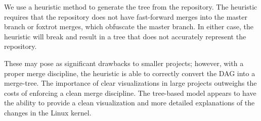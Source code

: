 \documentclass[conference, draftclsnofoot, draft]{IEEEtran}
\begin{document}
We use a heuristic method to generate the tree from the repository. The heuristic
requires that the repository does not have fast-forward merges into the master
branch or foxtrot merges, which obfuscate the master branch. In either case, the
heuristic will break and result in a tree that does not accurately represent the
repository.

These may pose as significant drawbacks to smaller projects; however, with a proper
merge discipline, the heuristic is able to correctly convert the DAG into a
merge-tree. The importance of clear visualizations in large projects outweighs
the costs of enforcing a clean merge discipline. The tree-based model appears to
have the ability to provide a clean visualization and more detailed explanations of
the changes in the Linux kernel.




\end{document}
